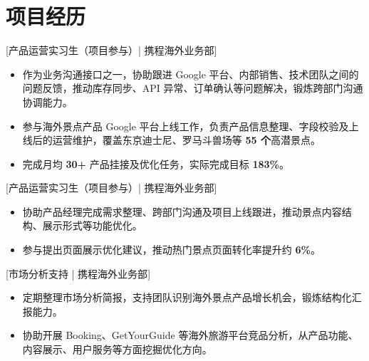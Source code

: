 \documentclass{resume}
\begin{document}
\section{项目经历}

[\textnormal{产品运营实习生（项目参与）| 携程海外业务部}]

\begin{itemize}

\item 作为业务沟通接口之一，协助跟进 Google 平台、内部销售、技术团队之间的问题反馈，推动库存同步、API 异常、订单确认等问题解决，锻炼跨部门沟通协调能力。

\item 参与海外景点产品 Google 平台上线工作，负责产品信息整理、字段校验及上线后的运营维护，覆盖东京迪士尼、罗马斗兽场等 \textbf{55 个}高潜景点。

\item 完成月均 \textbf{30+} 产品挂接及优化任务，实际完成目标 \textbf{183\%}。

\end{itemize}

[\textnormal{产品运营实习生（项目参与）| 携程海外业务部}]

\begin{itemize}

\item 协助产品经理完成需求整理、跨部门沟通及项目上线跟进，推动景点内容结构、展示形式等功能优化。

\item 参与提出页面展示优化建议，推动热门景点页面转化率提升约 \textbf{6\%}。

\end{itemize}

[\textnormal{市场分析支持 | 携程海外业务部}]

\begin{itemize}

\item 定期整理市场分析简报，支持团队识别海外景点产品增长机会，锻炼结构化汇报能力。

\item 协助开展 Booking、GetYourGuide 等海外旅游平台竞品分析，从产品功能、内容展示、用户服务等方面挖掘优化方向。

\end{itemize}
\end{document}
